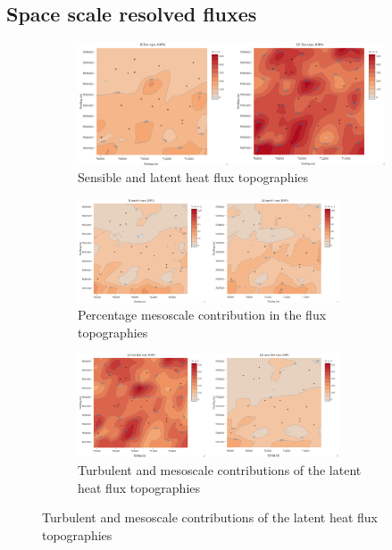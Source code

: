 \documentclass[draft]{agujournal2019}
\begin{document}
\subsection{Space scale resolved fluxes}
 \begin{figure}[hbtp]
     \begin{subfigure}{0.85\textwidth}
         \includegraphics[width=1\textwidth]{topo_infi.png}
         \caption{Sensible and latent heat flux topographies }
         \label{fig:topo_infi}
     \end{subfigure}
     \begin{subfigure}{\textwidth}
         \includegraphics[width=0.85\textwidth]{topo_meso_perc.png}
         \caption{Percentage mesoscale contribution in the flux topographies}
         \label{fig:topo_meso_perc}
     \end{subfigure}
     \begin{subfigure}{\textwidth}
         \includegraphics[width=0.85\textwidth]{topo_LE_turb_meso.png}
         \caption{Turbulent and mesoscale contributions of the latent heat flux topographies}
         \label{fig:topo_LE_turb_meso}

\end{subfigure}
\end{figure}
\end{document}
